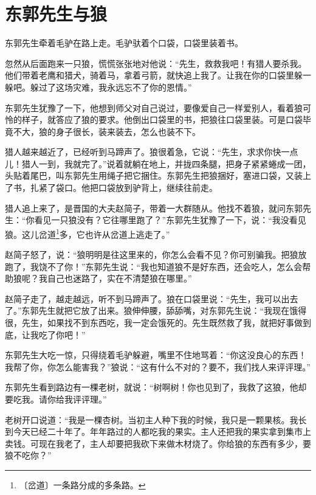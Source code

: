 \documentclass[12pt,UTF-8,openany]{ctexbook}
\begin{document}
\chapter{东郭先生与狼}

\begin{large}
    
    东郭先生牵着毛驴在路上走。毛驴驮着个口袋，口袋里装着书。
    
    忽然从后面跑来一只狼，慌慌张张地对他说：“先生，救救我吧！有猎人要杀我。他们带着老鹰和猎犬，骑着马，拿着弓箭，就快追上我了。让我在你的口袋里躲一躲吧。躲过了这场灾难，我永远忘不了你的恩情。”
    
    东郭先生犹豫了一下，他想到师父对自己说过，要像爱自己一样爱别人，看着狼可怜的样子，就答应了狼的要求。他倒出口袋里的书，把狼往口袋里装。可是口袋毕竟不大，狼的身子很长，装来装去，怎么也装不下。
    
    猎人越来越近了，已经听到马蹄声了。狼很着急，它说：“先生，求求你快一点儿！猎人一到，我就完了。”说着就躺在地上，并拢四条腿，把身子紧紧蜷成一团，头贴着尾巴，叫东郭先生用绳子把它捆住。东郭先生把狼捆好，塞进口袋，又装上了书，扎紧了袋口。他把口袋放到驴背上，继续往前走。
    
    猎人追上来了，是晋国的大夫赵简子，带着一大群随从。他找不着狼，就问东郭先生：“你看见一只狼没有？它往哪里跑了？”东郭先生犹豫了一下，说：“我没看见狼。这儿岔道\footnote{〔岔道〕一条路分成的多条路。}多，它也许从岔道上逃走了。”
    
    赵简子怒了，说：“狼明明是往这里来的，你怎么会看不见？你可别骗我。把狼放跑了，我饶不了你！”东郭先生说：“我也知道狼不是好东西，还会吃人，怎么会帮助狼呢？我自己也迷路了，实在不清楚狼在哪里。”
    
    赵简子走了，越走越远，听不到马蹄声了。狼在口袋里说：“先生，我可以出去了。”东郭先生就把它放了出来。狼伸伸腰，舔舔嘴，对东郭先生说：“我现在饿得很，先生，如果找不到东西吃，我一定会饿死的。先生既然救了我，就把好事做到底，让我吃了你吧！”
    
    东郭先生大吃一惊，只得绕着毛驴躲避，嘴里不住地骂着：“你这没良心的东西！我帮了你，你怎么能害我？”狼说：“这有什么不对的？要不，我们找人来评评理。”
    
    东郭先生看到路边有一棵老树，就说：“树啊树！你也见到了，我救了这狼，他却要吃我。请你给我评评理。”
    
    老树开口说道：“我是一棵杏树。当初主人种下我的时候，我只是一颗果核。我长到今天已经二十年了。年年路过的人都吃我的果实。主人还把我的果实拿到集市上卖钱。可现在我老了，主人却要把我砍下来做木材烧了。你给狼的东西有多少，要狼不吃你？”
    

\end{large}
\end{document}

